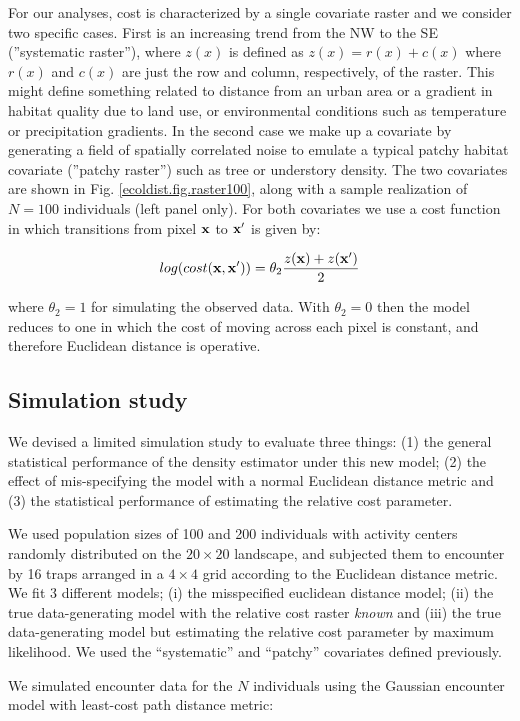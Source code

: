 \documentclass[12pt]{article}
\begin{document}
\begin{spacing}{1.8}
For our analyses, cost is characterized by a single covariate raster
and we consider two specific cases. First is an increasing trend from
the NW to the SE (''systematic raster''), where $z(x)$ is defined as
$z(x) = r(x) + c(x)$ where $r(x)$ and $c(x)$ are just the row and
column, respectively, of the raster.  This might define something
related to distance from an urban area or a gradient in habitat
quality due to land use, or environmental conditions such as
temperature or precipitation gradients.  In the second case we make up
a covariate by generating a field of spatially correlated noise to
emulate a typical patchy habitat covariate (''patchy raster'') such as
tree or understory density. The two covariates are shown in
Fig. \ref{ecoldist.fig.raster100}, along with a sample realization of
$N=100$ individuals (left panel only).  For both covariates we use a
cost function in which transitions from pixel ${\bf x}$ to ${\bf x}'$
is given by:

\[
 log(cost({\bf x},{\bf x}'))=  \theta_2 \frac{z({\bf x}) + z({\bf x}')}{2}
\]

{\flushleft where} $\theta_2 = 1$ for simulating the observed data.
 With $\theta_2=0$ then the
model reduces to one in which the cost of moving across each pixel is
constant, and therefore Euclidean distance is operative.

\subsection{Simulation study}

We devised a limited simulation study to evaluate three things: (1)
the general statistical performance of the density estimator under
this new model; (2) the effect of mis-specifying the model with a
normal Euclidean distance metric and (3) the statistical performance
of estimating the relative cost parameter.

We used population sizes of 100 and 200 individuals with activity
centers randomly distributed on the $20 \times 20$ landscape, and subjected them
to encounter by 16 traps arranged in a $4\times 4$ grid according to
the Euclidean distance metric. We fit 3 different models; (i) the
misspecified euclidean distance model; (ii) the true data-generating
model with the relative cost raster {\it known} and (iii) the true
data-generating model but estimating the relative cost parameter by
maximum likelihood.  We used the ``systematic'' and ``patchy''
covariates defined previously. 

We simulated encounter data for the $N$ individuals using the Gaussian
encounter model with least-cost path distance metric:


\end{spacing}
\end{document}
